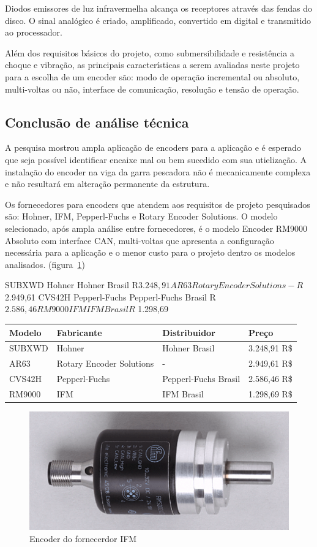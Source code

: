 Diodos emissores de luz infravermelha alcança os receptores através das fendas do disco. O sinal analógico é criado, amplificado, convertido em digital e transmitido ao processador.

Além dos requisitos básicos do projeto, como submersibilidade e resistência a choque e vibração, as principais características a serem avaliadas neste projeto para a escolha de um encoder são: modo de operação incremental ou absoluto, multi-voltas ou não, interface de comunicação, resolução e tensão de operação.

 \subsection{Conclusão de análise técnica}
A pesquisa mostrou ampla aplicação de encoders para a aplicação e é esperado que seja possível identificar encaixe mal ou bem sucedido com sua utielização. A instalação do encoder na viga da garra pescadora não é mecanicamente complexa e não resultará em alteração permanente da estrutura.


Os fornecedores para encoders que atendem aos requisitos de projeto pesquisados são: Hohner, IFM, Pepperl-Fuchs e Rotary Encoder Solutions. O modelo selecionado, após ampla análise entre fornecedores, é o
modelo Encoder RM9000 Absoluto com interface CAN, multi-voltas que apresenta a configuração necessária para a aplicação e o menor custo para o projeto dentro os modelos analisados. 
(figura~\ref{encoder_1})

SUBXWD	Hohner	Hohner Brasil	R$ 3.248,91
AR63	Rotary Encoder Solutions	-	R$ 2.949,61
CVS42H	Pepperl-Fuchs	Pepperl-Fuchs Brasil	R$ 2.586,46
RM9000	IFM	IFM Brasil	R$ 1.298,69

\begin{center}
    \begin{tabular}{| l | l | l | l | }
    \hline
	{\bf Modelo} 	& 	{\bf Fabricante} 	&		{\bf Distribuidor}	&	{\bf Preço} \\  \hline
	SUBXWD&			Hohner&					Hohner Brasil&			 3.248,91 R{\$} \\  \hline
	AR63&			Rotary Encoder Solutions	&	-&					2.949,61 R{\$} \\  \hline
	CVS42H&			Pepperl-Fuchs&			Pepperl-Fuchs Brasil&	2.586,46 R{\$} \\  \hline
	RM9000&			IFM&						IFM Brasil&			1.298,69 R{\$} \\ \hline
\hline 
\end{tabular}
\end{center}

\begin{figure}[H]
    \centering
    \includegraphics[width=0.4\columnwidth]{figs/encoder/1.png}
    \caption{Encoder do fornecerdor IFM}
    \label{encoder_1}
\end{figure}

